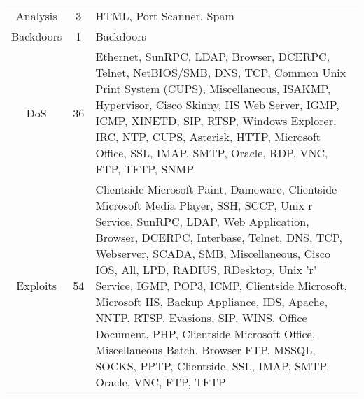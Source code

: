 \begin{table}[htbp]
\begin{tabularx}{\textwidth}{@{}ccX@{}}
		Analysis                          & 3                                 & HTML, Port Scanner, Spam                                                                                                                                                                                                                                                                                                                                                                                                                                                                                                                                            \\
		Backdoors                         & 1                                 & Backdoors                                                                                                                                                                                                                                                                                                                                                                                                                                                                                                                                                           \\
		DoS                               & 36                                & Ethernet, SunRPC, LDAP, Browser, DCERPC, Telnet, NetBIOS/SMB, DNS, TCP, Common Unix Print System (CUPS), Miscellaneous, ISAKMP, Hypervisor,
		Cisco Skinny, IIS Web Server, IGMP, ICMP, XINETD, SIP, RTSP, Windows Explorer, IRC, NTP, CUPS, Asterisk, HTTP, Microsoft Office, SSL, IMAP, SMTP, Oracle, RDP, VNC, FTP, TFTP, SNMP                                                                                                                                                                                                                                                                                                                                                                                                                                                         \\
		Exploits                          & 54                                & Clientside Microsoft Paint, Dameware, Clientside Microsoft Media Player, SSH, SCCP, Unix r Service, SunRPC, LDAP, Web Application, Browser, DCERPC, Interbase, Telnet, DNS, TCP, Webserver, SCADA, SMB, Miscellaneous, Cisco IOS, All, LPD, RADIUS, RDesktop, Unix 'r' Service, IGMP, POP3, ICMP, Clientside Microsoft, Microsoft IIS, Backup Appliance, IDS, Apache, NNTP, RTSP, Evasions, SIP, WINS, Office Document, PHP, Clientside Microsoft Office, Miscellaneous Batch, Browser FTP, MSSQL, SOCKS, PPTP, Clientside, SSL, IMAP, SMTP, Oracle, VNC, FTP, TFTP \\

\end{tabularx}
\end{table}
